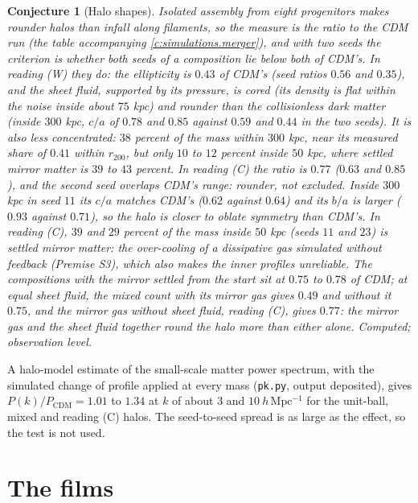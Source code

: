 \documentclass[11pt]{article}
\newtheorem{conjecture}[theorem]{Conjecture}
\theoremstyle{definition}
\theoremstyle{plain}
\providecommand{\file}{}\renewcommand{\file}[1]{\texttt{#1}}
\begin{document}
\begin{conjecture}[Halo shapes]\label{c:simulations.halo-shapes}
Isolated assembly from eight progenitors makes rounder halos than infall along filaments, so the measure is the ratio to the CDM run (the table accompanying \ref{c:simulations.merger}), and with two seeds the criterion is whether both seeds of a composition lie below both of CDM's. In reading (W) they do: the ellipticity is $0.43$ of CDM's (seed ratios $0.56$ and $0.35$), and the sheet fluid, supported by its pressure, is cored (its density is flat within the noise inside about $75$ kpc) and rounder than the collisionless dark matter (inside $300$ kpc, $c/a$ of $0.78$ and $0.85$ against $0.59$ and $0.44$ in the two seeds). It is also less concentrated: $38$ percent of the mass within $300$ kpc, near its measured share of $0.41$ within $r_{200}$, but only $10$ to $12$ percent inside $50$ kpc, where settled mirror matter is $39$ to $43$ percent. In reading (C) the ratio is $0.77$ ($0.63$ and $0.85$), and the second seed overlaps CDM's range: rounder, not excluded. Inside $300$ kpc in seed $11$ its $c/a$ matches CDM's ($0.62$ against $0.64$) and its $b/a$ is larger ($0.93$ against $0.71$), so the halo is closer to oblate symmetry than CDM's. In reading (C), $39$ and $29$ percent of the mass inside $50$ kpc (seeds $11$ and $23$) is settled mirror matter: the over-cooling of a dissipative gas simulated without feedback (Premise S3), which also makes the inner profiles unreliable. The compositions with the mirror settled from the start sit at $0.75$ to $0.78$ of CDM; at equal sheet fluid, the mixed count with its mirror gas gives $0.49$ and without it $0.75$, and the mirror gas without sheet fluid, reading (C), gives $0.77$: the mirror gas and the sheet fluid together round the halo more than either alone. Computed; observation level.
\end{conjecture}

\label{c:note.simulations.setting-cluster-assembly-3}
A halo-model estimate of the small-scale matter power spectrum, with the simulated change of profile applied at every mass (\file{pk.py}, output deposited), gives $P(k)/P_{\mathrm{CDM}} = 1.01$ to $1.34$ at $k$ of about $3$ and $10\ h\,\mathrm{Mpc^{-1}}$ for the unit-ball, mixed and reading (C) halos. The seed-to-seed spread is as large as the effect, so the test is not used.

\section{The films}
\end{document}
